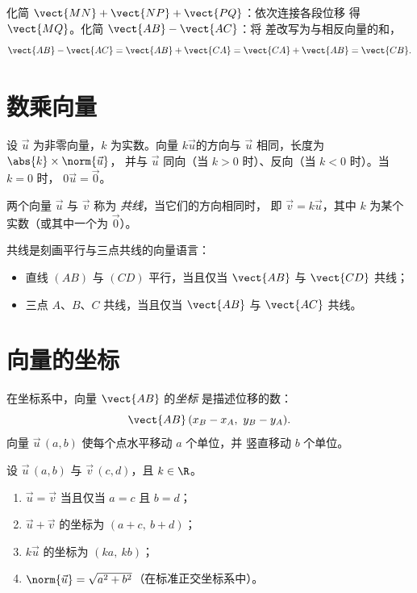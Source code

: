 \begin{example}[利用沙勒关系化简]\label{ex:g10:vectors:chasles}
化简 $\vect{MN} + \vect{NP} + \vect{PQ}$：依次连接各段位移
得 $\vect{MQ}$。化简 $\vect{AB} - \vect{AC}$：将
差改写为与相反向量的和，
\[
\vect{AB} - \vect{AC} = \vect{AB} + \vect{CA}
= \vect{CA} + \vect{AB} = \vect{CB}.
\]
\end{example}

\section{数乘向量}

\begin{definition}[数乘]\label{def:g10:vectors:scalar}
设 $\vec u$ 为非零向量，$k$ 为实数。向量
$k\vec u$的方向与
$\vec u$ 相同，长度为 $\abs{k} \times \norm{\vec u}$，
并与 $\vec u$ 同向（当 $k > 0$ 时）、反向（当 $k < 0$ 时）。当 $k = 0$ 时，
$0\vec u = \vec 0$。
\end{definition}

\begin{definition}[共线]\label{def:g10:vectors:collinear}
两个向量 $\vec u$ 与 $\vec v$ 称为
\emph{共线}，当它们的方向相同时，
即 $\vec v = k \vec u$，其中 $k$ 为某个实数（或其中一个为
$\vec 0$）。
\end{definition}

\begin{remark}
共线是刻画平行与三点共线的向量语言：
\begin{itemize}
  \item 直线 $(AB)$ 与 $(CD)$ 平行，当且仅当 $\vect{AB}$
        与 $\vect{CD}$ 共线；
  \item 三点 $A$、$B$、$C$ 共线，当且仅当 $\vect{AB}$ 与
        $\vect{AC}$ 共线。
\end{itemize}
\end{remark}

\section{向量的坐标}

\begin{definition}[向量的坐标]\label{def:g10:vectors:coords}
在坐标系中，向量 $\vect{AB}$ 的\emph{坐标}
是描述位移的数：
\[
\vect{AB}\,(x_B - x_A,\ y_B - y_A).
\]
向量 $\vec u\,(a, b)$ 使每个点水平移动 $a$ 个单位，并
竖直移动 $b$ 个单位。
\end{definition}

\begin{proposition}[利用坐标进行计算]\label{prop:g10:vectors:coordrules}
设 $\vec u\,(a, b)$ 与 $\vec v\,(c, d)$，且 $k \in \R$。
\begin{enumerate}
  \item $\vec u = \vec v$ 当且仅当 $a = c$ 且 $b = d$；
  \item $\vec u + \vec v$ 的坐标为 $(a + c,\ b + d)$；
  \item $k\vec u$ 的坐标为 $(ka,\ kb)$；
  \item $\norm{\vec u} = \sqrt{a^2 + b^2}$（在标准正交坐标系中）。
\end{enumerate}
\end{proposition}

